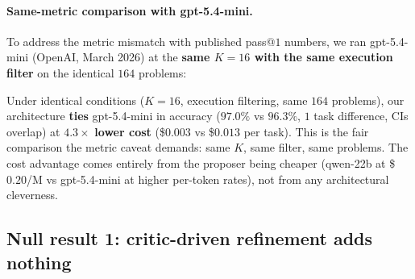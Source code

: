 \documentclass[11pt]{amsart}
\newcommand\1{{\mathds{1}}}
\theoremstyle{definition}
\theoremstyle{remark}
\numberwithin{equation}{section}
\begin{document}
\paragraph{Same-metric comparison with gpt-5.4-mini.}
To address the metric mismatch with published pass@$1$ numbers, we ran gpt-5.4-mini (OpenAI, March 2026) at the \textbf{same $K\!=\!16$ with the same execution filter} on the identical $164$ problems:

\begin{table}[h]
\centering\small
\caption{HumanEval-164 with \textbf{same-metric comparison}. Both rows use pass@$16$ with execution filtering on the same $164$ problems. Published pass@$1$ numbers shown for reference only.}
\label{tab:humaneval-cost}
\end{table}

Under identical conditions ($K\!=\!16$, execution filtering, same $164$ problems), our architecture \textbf{ties} gpt-5.4-mini in accuracy ($97.0\%$ vs $96.3\%$, $1$ task difference, CIs overlap) at $\mathbf{4.3\times}$ \textbf{lower cost} (\$$0.003$ vs \$$0.013$ per task).
This is the fair comparison the metric caveat demands: same $K$, same filter, same problems.
The cost advantage comes entirely from the proposer being cheaper (qwen-22b at \$$0.20$/M vs gpt-5.4-mini at higher per-token rates), not from any architectural cleverness.

\subsection{Null result 1: critic-driven refinement adds nothing}\label{sec:act2-critic}
\end{document}
